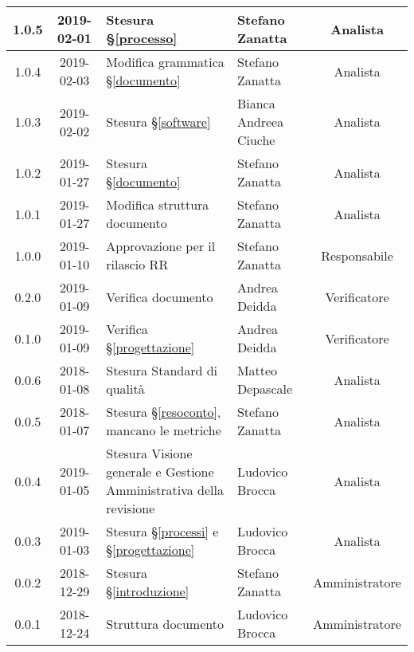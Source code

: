 \begin{center}
\begin{tabularx}{\textwidth}{|c|c|X|X|c|}
			\hline
			1.0.5 & 2019-02-01 & Stesura \S\ref{processo}& Stefano Zanatta & Analista\\
			\hline
			1.0.4 & 2019-02-03 & Modifica grammatica \S\ref{documento}& Stefano Zanatta & Analista\\
			\hline
			1.0.3 & 2019-02-02 & Stesura \S\ref{software}& Bianca Andreea Ciuche & Analista\\
			\hline
			1.0.2 & 2019-01-27 & Stesura \S\ref{documento}& Stefano Zanatta & Analista\\
			\hline
			1.0.1 & 2019-01-27 & Modifica struttura documento & Stefano Zanatta & Analista\\
			\hline
			1.0.0 & 2019-01-10 & Approvazione per il rilascio RR & Stefano Zanatta & Responsabile\\
			\hline
			0.2.0 & 2019-01-09 & Verifica documento & Andrea Deidda & Verificatore\\
			\hline
			0.1.0 & 2019-01-09 & Verifica \S\ref{progettazione} & Andrea Deidda & Verificatore\\
			\hline
			0.0.6 & 2018-01-08 & Stesura Standard di qualità & Matteo Depascale & Analista\\
			\hline
			0.0.5 & 2018-01-07 & Stesura \S\ref{resoconto}, mancano le metriche & Stefano Zanatta & Analista\\
			\hline
			0.0.4 & 2019-01-05 & Stesura Visione generale e Gestione Amministrativa della revisione  & Ludovico Brocca& Analista\\
			\hline
			0.0.3 & 2019-01-03& Stesura \S\ref{processi} e \S\ref{progettazione} &Ludovico Brocca & Analista\\
			\hline
			0.0.2 & 2018-12-29 & Stesura \S\ref{introduzione} & Stefano Zanatta & Amministratore\\
			\hline
			0.0.1 & 2018-12-24 & Struttura documento & Ludovico Brocca & Amministratore\\
			\hline
		\end{tabularx}
	\end{center}
\newpage

